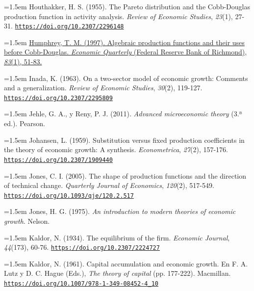 \documentclass[10pt,a4paper]{article}
\begin{document}
\noindent\hangindent=1.5em Houthakker, H. S. (1955). The Pareto distribution and the Cobb-Douglas production function in activity analysis. \textit{Review of Economic Studies}, \textit{23}(1), 27-31. \href{https://doi.org/10.2307/2296148}{\nolinkurl{https://doi.org/10.2307/2296148}}

\noindent\hangindent=1.5em \href{https://www.richmondfed.org/publications/research/economic_quarterly/1997/winter/humphrey}{Humphrey, T. M. (1997). Algebraic production functions and their uses before Cobb-Douglas. \textit{Economic Quarterly} (Federal Reserve Bank of Richmond), \textit{83}(1), 51-83.}

\noindent\hangindent=1.5em Inada, K. (1963). On a two-sector model of economic growth: Comments and a generalization. \textit{Review of Economic Studies}, \textit{30}(2), 119-127. \href{https://doi.org/10.2307/2295809}{\nolinkurl{https://doi.org/10.2307/2295809}}

\noindent\hangindent=1.5em Jehle, G. A., y Reny, P. J. (2011). \textit{Advanced microeconomic theory} (3.ª ed.). Pearson.

\noindent\hangindent=1.5em Johansen, L. (1959). Substitution versus fixed production coefficients in the theory of economic growth: A synthesis. \textit{Econometrica}, \textit{27}(2), 157-176. \href{https://doi.org/10.2307/1909440}{\nolinkurl{https://doi.org/10.2307/1909440}}

\noindent\hangindent=1.5em Jones, C. I. (2005). The shape of production functions and the direction of technical change. \textit{Quarterly Journal of Economics}, \textit{120}(2), 517-549. \href{https://doi.org/10.1093/qje/120.2.517}{\nolinkurl{https://doi.org/10.1093/qje/120.2.517}}

\noindent\hangindent=1.5em Jones, H. G. (1975). \textit{An introduction to modern theories of economic growth}. Nelson.

\noindent\hangindent=1.5em Kaldor, N. (1934). The equilibrium of the firm. \textit{Economic Journal}, \textit{44}(173), 60-76. \href{https://doi.org/10.2307/2224727}{\nolinkurl{https://doi.org/10.2307/2224727}}

\noindent\hangindent=1.5em Kaldor, N. (1961). Capital accumulation and economic growth. En F. A. Lutz y D. C. Hague (Eds.), \textit{The theory of capital} (pp. 177-222). Macmillan. \href{https://doi.org/10.1007/978-1-349-08452-4_10}{\nolinkurl{https://doi.org/10.1007/978-1-349-08452-4_10}}
\end{document}
